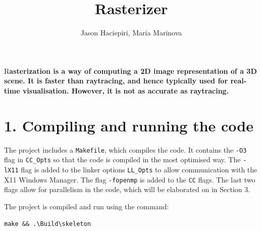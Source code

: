 \documentclass[DIV=calc, paper=a4, fontsize=11pt, twocolumn]{article}	 %
\title{Rasterizer} %
\author{Jason Haciepiri, Maria Marinova} %
\date{\vspace{-30pt}} %
\newcommand{\initial}[1]{ %
	\lettrine[lines=3,lhang=0.3,nindent=0em]{
		\color{Goldenrod}
		{\textsf{#1}}}{}}
\begin{document}
	
	\maketitle %
	
	\thispagestyle{fancy} %
	
	
	\initial{R}\textbf{asterization is a way of computing a 2D image representation of a 3D scene. It is faster than raytracing, and hence typically used for real-time visualisation. However, it is not as accurate as raytracing.}
	
	
	\section*{1. Compiling and running the code}

	The project includes a \texttt{Makefile}, which compiles the code. It contains the \texttt{-O3} flag in \texttt{CC\_Opts} so that the code is compiled in the most optimised way. The \texttt{-lX11} flag is added to the linker options \texttt{LL\_Opts} to allow communication with the X11 Windows Manager. The flag \texttt{-fopenmp} is added to the \texttt{CC} flags. The last two flags allow for parallelism in the code, which will be elaborated on in Section 3. 
	\par
	The project is compiled and run using the command: \par
		\texttt{make \&\&  .\textbackslash Build\textbackslash skeleton}
 
\end{document}
